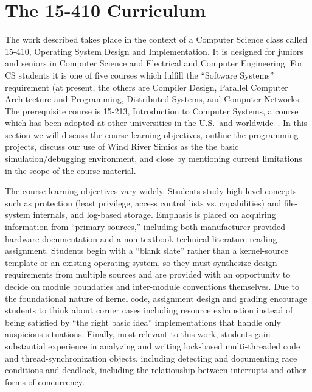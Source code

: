 \section{The 15-410 Curriculum}
\label{sec:curriculum}

The work described takes place in the context of a
Computer Science class called
15-410, Operating System Design and Implementation.
It is designed for juniors and seniors in Computer Science
and Electrical and Computer Engineering.
For CS students it is one of five courses which fulfill
the ``Software Systems'' requirement (at present, the others
are Compiler Design,
Parallel Computer Architecture and Programming,
Distributed Systems,
and Computer Networks.
The prerequisite course is 15-213,
Introduction to Computer Systems,
a course which has been adopted at other
universities in the U.S.\ and worldwide~\cite{sigcse01:CSaPP}.
In this section we will discuss the course learning
objectives,
outline the programming projects,
discuss our use of Wind River Simics as the
the basic simulation/debugging environment,
and close by mentioning current limitations in the scope
of the course material.

The course learning objectives vary widely.
%
Students study high-level concepts
such as protection (least privilege, access control lists vs.
capabilities)
and
file-system internals,
and log-based storage.
%
Emphasis is placed on acquiring information from ``primary sources,''
including both manufacturer-provided hardware documentation
and a non-textbook technical-literature reading assignment.
%
Students begin with a ``blank slate'' rather than a
kernel-source template or an existing operating system,
so they must synthesize design requirements from multiple sources
and are provided with an opportunity to 
decide on module boundaries and inter-module conventions
themselves.
%
Due to the foundational nature of kernel code,
assignment design and grading encourage students to
think about corner cases including resource exhaustion
instead of being satisfied by ``the right basic idea''
implementations that handle only auspicious situations.
%
Finally, most relevant to this work,
students gain substantial experience in
analyzing and writing lock-based multi-threaded code and
thread-synchronization objects, including detecting and documenting race conditions and deadlock,
including
the relationship between interrupts and other forms of concurrency.

